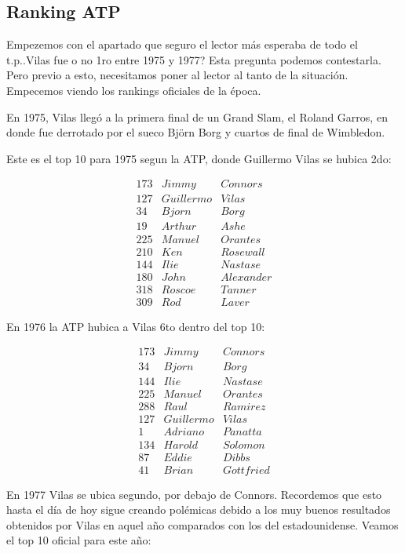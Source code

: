 \subsection{Ranking ATP}

Empezemos con el apartado que seguro el lector más esperaba de todo el t.p..Vilas fue o no 1ro entre 1975 y 1977? Esta pregunta podemos contestarla. Pero previo a esto, necesitamos poner al lector al tanto de la situación. Empecemos viendo los rankings oficiales de la época.


En 1975, Vilas llegó a la primera final de un Grand Slam, el Roland Garros, en donde fue derrotado por el sueco Björn Borg
y cuartos de final de Wimbledon.


Este es el top 10 para 1975 segun la ATP, donde Guillermo Vilas se hubica 2do:

\begin{eqnarray*}
173 & Jimmy & Connors \\
127 & Guillermo & Vilas \\
34 & Bjorn & Borg \\
19 & Arthur & Ashe \\
225 & Manuel & Orantes \\
210 & Ken & Rosewall \\
144 & Ilie & Nastase \\
180 & John & Alexander \\
318 & Roscoe & Tanner \\
309 & Rod & Laver 
\end{eqnarray*}

En 1976 la ATP hubica a Vilas 6to dentro del top 10:

\begin{eqnarray*}
173 & Jimmy & Connors \\
34 & Bjorn & Borg \\
144 & Ilie & Nastase \\
225 & Manuel & Orantes \\
288 & Raul & Ramirez \\
127 & Guillermo & Vilas \\
1 & Adriano & Panatta \\
134 & Harold & Solomon \\
87 & Eddie & Dibbs \\
41 & Brian & Gottfried 
\end{eqnarray*}

En 1977 Vilas se ubica segundo, por debajo de Connors. Recordemos que esto hasta el día de hoy sigue creando polémicas debido a los muy buenos resultados obtenidos por Vilas en aquel año comparados con los del estadounidense.
Veamos el top 10 oficial para este año:

